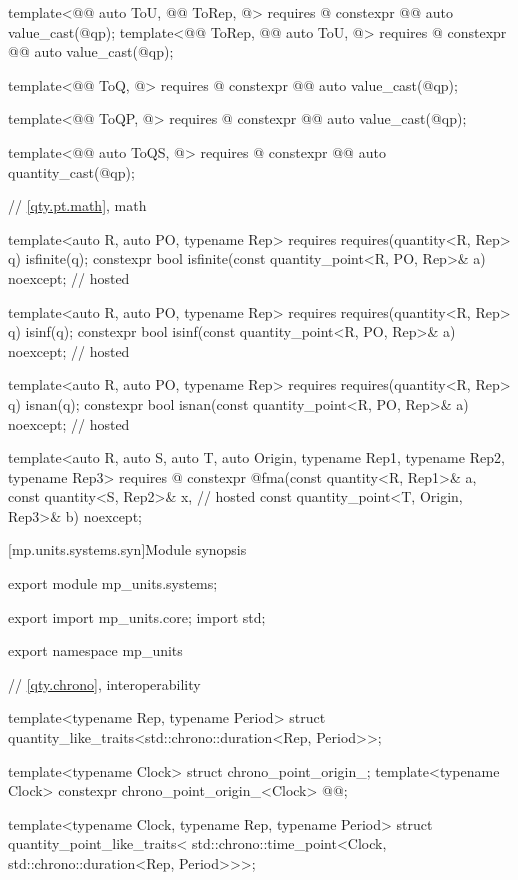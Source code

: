 \begin{codeblock}
{template<@@ auto ToU, @@ ToRep, @\seebelownc@>
  requires @\seebelownc@
constexpr @@ auto value_cast(@\seebelownc@ qp);
template<@@ ToRep, @@ auto ToU, @\seebelownc@>
  requires @\seebelownc@
constexpr @@ auto value_cast(@\seebelownc@ qp);

template<@@ ToQ, @\seebelownc@>
  requires @\seebelownc@
constexpr @@ auto value_cast(@\seebelownc@ qp);

template<@@ ToQP, @\seebelownc@>
  requires @\seebelownc@
constexpr @@ auto value_cast(@\seebelownc@ qp);

template<@@ auto ToQS, @\seebelownc@>
  requires @\seebelownc@
constexpr @@ auto quantity_cast(@\seebelownc@ qp);

// \ref{qty.pt.math}, math

template<auto R, auto PO, typename Rep>
  requires requires(quantity<R, Rep> q) { isfinite(q); }
constexpr bool isfinite(const quantity_point<R, PO, Rep>& a) noexcept;                  // hosted

template<auto R, auto PO, typename Rep>
  requires requires(quantity<R, Rep> q) { isinf(q); }
constexpr bool isinf(const quantity_point<R, PO, Rep>& a) noexcept;                     // hosted

template<auto R, auto PO, typename Rep>
  requires requires(quantity<R, Rep> q) { isnan(q); }
constexpr bool isnan(const quantity_point<R, PO, Rep>& a) noexcept;                     // hosted

template<auto R, auto S, auto T, auto Origin, typename Rep1, typename Rep2, typename Rep3>
  requires @\seebelownc@
constexpr @\seebelownc@ fma(const quantity<R, Rep1>& a, const quantity<S, Rep2>& x,         // hosted
                        const quantity_point<T, Origin, Rep3>& b) noexcept;

}
\end{codeblock}

[mp.units.systems.syn]{Module  synopsis}
%
\begin{codeblock}
export module mp_units.systems;

export import mp_units.core;
import std;

export namespace mp_units {

// \ref{qty.chrono},  interoperability

template<typename Rep, typename Period>
struct quantity_like_traits<std::chrono::duration<Rep, Period>>;

template<typename Clock>
struct chrono_point_origin_;
template<typename Clock>
constexpr chrono_point_origin_<Clock> @@{};

template<typename Clock, typename Rep, typename Period>
struct quantity_point_like_traits<
  std::chrono::time_point<Clock, std::chrono::duration<Rep, Period>>>;

}
\end{codeblock}

